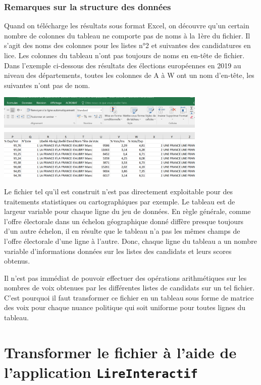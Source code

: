 \documentclass[
]{article}
\begin{document}
\hypertarget{remarques-sur-la-structure-des-donnuxe9es}{%
\subsubsection{Remarques sur la structure des
données}\label{remarques-sur-la-structure-des-donnuxe9es}}

Quand on télécharge les résultats sous format Excel, on découvre qu'un
certain nombre de colonnes du tableau ne comporte pas de noms à la 1ère
du fichier. Il s'agit des noms des colonnes pour les listes n°2 et
suivantes des candidatures en lice. Les colonnes du tableau n'ont pas
toujours de noms en en-tête de fichier. Dans l'exemple ci-dessous des
résultats des élections européennes en 2019 au niveau des départements,
toutes les colonnes de A à W ont un nom d'en-tête, les suivantes n'ont
pas de nom.

\includegraphics[width=0.75\textwidth,height=\textheight]{fig/resultats-excel.png}

Le fichier tel qu'il est construit n'est pas directement exploitable
pour des traitements statistiques ou cartographiques par exemple. Le
tableau est de largeur variable pour chaque ligne du jeu de données. En
règle générale, comme l'offre électorale dans un échelon géographique
donné diffère presque toujours d'un autre échelon, il en résulte que le
tableau n'a pas les mêmes champs de l'offre électorale d'une ligne à
l'autre. Donc, chaque ligne du tableau a un nombre variable
d'informations données sur les listes des candidats et leurs scores
obtenus.

Il n'est pas immédiat de pouvoir effectuer des opérations arithmétiques
sur les nombres de voix obtenues par les différentes listes de candidats
sur un tel fichier. C'est pourquoi il faut transformer ce fichier en un
tableau sous forme de matrice des voix pour chaque nuance politique qui
soit uniforme pour toutes lignes du tableau.

\hypertarget{transformer-le-fichier-uxe0-laide-de-lapplication-lireinteractif}{%
\section{\texorpdfstring{Transformer le fichier à l'aide de
l'application
\texttt{LireInteractif}}{Transformer le fichier à l'aide de l'application LireInteractif}}\label{transformer-le-fichier-uxe0-laide-de-lapplication-lireinteractif}}
\end{document}
